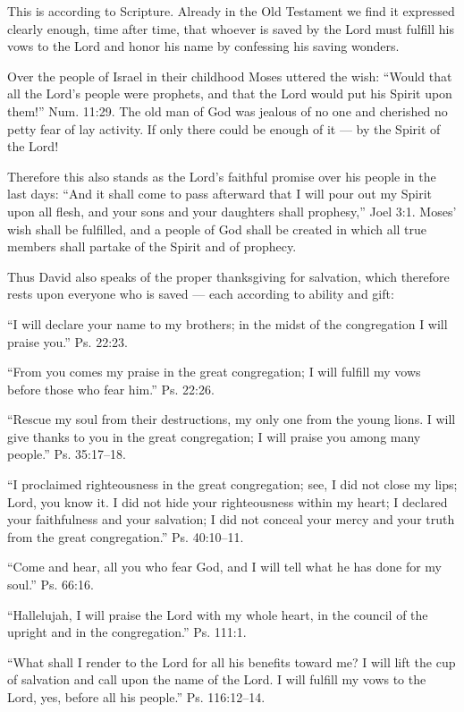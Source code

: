 This is according to Scripture. Already in the Old Testament we find it expressed clearly enough, time after time, that whoever is saved by the Lord must fulfill his vows to the Lord and honor his name by confessing his saving wonders.

Over the people of Israel in their childhood Moses uttered the wish: “Would that all the Lord’s people were prophets, and that the Lord would put his Spirit upon them!” Num. 11:29. The old man of God was jealous of no one and cherished no petty fear of lay activity. If only there could be enough of it — by the Spirit of the Lord!

Therefore this also stands as the Lord’s faithful promise over his people in the last days: “And it shall come to pass afterward that I will pour out my Spirit upon all flesh, and your sons and your daughters shall prophesy,” Joel 3:1. Moses’ wish shall be fulfilled, and a people of God shall be created in which all true members shall partake of the Spirit and of prophecy.

Thus David also speaks of the proper thanksgiving for salvation, which therefore rests upon everyone who is saved — each according to ability and gift:

“I will declare your name to my brothers; in the midst of the congregation I will praise you.” Ps. 22:23.

“From you comes my praise in the great congregation; I will fulfill my vows before those who fear him.” Ps. 22:26.

“Rescue my soul from their destructions, my only one from the young lions. I will give thanks to you in the great congregation; I will praise you among many people.” Ps. 35:17–18.

“I proclaimed righteousness in the great congregation; see, I did not close my lips; Lord, you know it. I did not hide your righteousness within my heart; I declared your faithfulness and your salvation; I did not conceal your mercy and your truth from the great congregation.” Ps. 40:10–11.

“Come and hear, all you who fear God, and I will tell what he has done for my soul.” Ps. 66:16.

“Hallelujah, I will praise the Lord with my whole heart, in the council of the upright and in the congregation.” Ps. 111:1.

“What shall I render to the Lord for all his benefits toward me? I will lift the cup of salvation and call upon the name of the Lord. I will fulfill my vows to the Lord, yes, before all his people.” Ps. 116:12–14.


